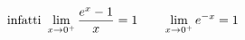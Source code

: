 \documentclass[preview]{standalone}
\begin{document}
\begin{align*}
\special{dvisvgm:raw <g id='unique000'>}\text{infatti } \lim_{x \rightarrow 0^+} \frac{e^x - 1}{x} = 1 \qquad \lim_{x \rightarrow 0^+} e^{-x} = 1\special{dvisvgm:raw </g>}
\end{align*}
\end{document}
